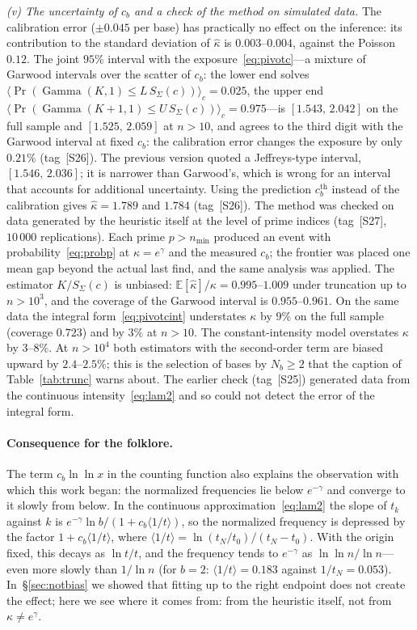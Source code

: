 \documentclass[11pt,a4paper]{article}
\theoremstyle{plain}
\theoremstyle{remark}
\newcommand{\eg}{e^{\gamma}}
\newcommand{\emg}{e^{-\gamma}}
\DeclareMathOperator{\Gam}{Gamma}
\begin{document}
\emph{(v) The uncertainty of $c_b$ and a check of the method on simulated data.}
The calibration error ($\pm0.045$ per base) has practically no effect on the
inference: its contribution to the standard deviation of $\hat\kappa$ is
$0.003$--$0.004$, against the Poisson $0.12$. The joint $95\%$ interval with the
exposure~\eqref{eq:pivotc}---a mixture of Garwood intervals over the scatter of
$c_b$: the lower end solves
$\langle\Pr(\Gam(K,1)\le L\,S_\Sigma(c))\rangle_c=0.025$, the upper end
$\langle\Pr(\Gam(K+1,1)\le U\,S_\Sigma(c))\rangle_c=0.975$---is $[1.543,\,2.042]$
on the full sample and $[1.525,\,2.059]$ at $n>10$, and agrees to the third digit
with the Garwood interval at fixed $c_b$: the calibration error changes the
exposure by only $0.21\%$ (tag~[S26]). The previous version quoted a Jeffreys-type
interval, $[1.546,\,2.036]$; it is narrower than Garwood's, which is wrong for an
interval that accounts for additional uncertainty. Using the
prediction $c^{\mathrm{th}}_b$ instead of the calibration gives
$\hat\kappa=1.789$ and $1.784$ (tag~[S26]). The method was checked on data
generated by the heuristic itself at the level of prime indices (tag~[S27],
$10\,000$ replications). Each prime $p>n_{\min}$ produced an event with
probability~\eqref{eq:probp} at $\kappa=\eg$ and the measured $c_b$; the frontier
was placed one mean gap beyond the actual last find, and the same analysis was
applied. The estimator $K/S_\Sigma(c)$ is unbiased:
$\mathbb E[\hat\kappa]/\kappa=0.995$--$1.009$ under truncation up to $n>10^3$, and
the coverage of the Garwood interval is $0.955$--$0.961$. On the same data the
integral form~\eqref{eq:pivotcint} understates $\kappa$ by $9\%$ on the full
sample (coverage $0.723$) and by $3\%$ at $n>10$. The constant-intensity model
overstates $\kappa$ by $3$--$8\%$. At $n>10^4$ both estimators with the
second-order term are biased upward by $2.4$--$2.5\%$; this is the selection of
bases by $N_b\ge2$ that the caption of Table~\ref{tab:trunc} warns about. The
earlier check (tag~[S25]) generated data from the continuous
intensity~\eqref{eq:lam2} and so could not detect the error of the integral form.

\paragraph{Consequence for the folklore.} The term $c_b\ln\ln x$ in the counting
function also explains the observation with which this work began: the
normalized frequencies lie below $\emg$ and converge to it slowly from below.
In the continuous approximation~\eqref{eq:lam2} the slope of $t_k$ against $k$ is
$\emg\ln b/(1+c_b\langle1/t\rangle)$, so the normalized frequency is depressed by
the factor $1+c_b\langle1/t\rangle$, where
$\langle1/t\rangle=\ln(t_N/t_0)/(t_N-t_0)$. With the origin fixed, this decays as
$\ln t/t$, and the frequency tends to $\emg$ as $\ln\ln n/\ln n$---even more
slowly than $1/\ln n$ (for $b=2$: $\langle1/t\rangle=0.183$ against
$1/t_N=0.053$). In~\S\ref{sec:notbias} we showed that fitting up to
the right endpoint does not create the effect; here we see where it comes from:
from the heuristic itself, not from~$\kappa\ne\eg$.
\end{document}
